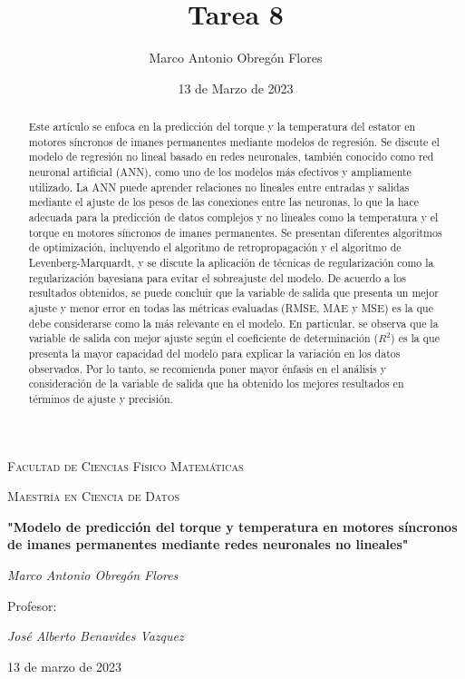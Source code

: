 \documentclass{article}
\title{Tarea 8}
\author{Marco Antonio Obregón Flores}
\date{13 de Marzo de 2023}
\begin{document}
\begin{titlepage}
    \centering
    {\scshape\large Facultad de Ciencias Físico Matemáticas\par}
    {\scshape\large Maestría en Ciencia de Datos\par}
    \vspace{1cm}
    {\huge\bfseries "Modelo de predicción del torque y temperatura en motores síncronos de imanes permanentes mediante redes neuronales no lineales"\par}
    \vspace{2cm}
    {\Large\itshape Marco Antonio Obregón Flores\par}
    \vfill
    {\large Profesor:\par}
    {\Large\itshape José Alberto Benavides Vazquez\par}
    \vspace{1cm}
    {\large 13 de marzo de 2023\par}
\end{titlepage}

\begin{abstract}
Este artículo se enfoca en la predicción del torque y la temperatura del estator en motores síncronos de imanes permanentes mediante modelos de regresión. Se discute el modelo de regresión no lineal basado en redes neuronales, también conocido como red neuronal artificial (ANN), como uno de los modelos más efectivos y ampliamente utilizado. La ANN puede aprender relaciones no lineales entre entradas y salidas mediante el ajuste de los pesos de las conexiones entre las neuronas, lo que la hace adecuada para la predicción de datos complejos y no lineales como la temperatura y el torque en motores síncronos de imanes permanentes. Se presentan diferentes algoritmos de optimización, incluyendo el algoritmo de retropropagación y el algoritmo de Levenberg-Marquardt, y se discute la aplicación de técnicas de regularización como la regularización bayesiana para evitar el sobreajuste del modelo.
De acuerdo a los resultados obtenidos, se puede concluir que la variable de salida que presenta un mejor ajuste y menor error en todas las métricas evaluadas (RMSE, MAE y MSE) es la que debe considerarse como la más relevante en el modelo. En particular, se observa que la variable de salida con mejor ajuste según el coeficiente de determinación ($R^2$) es la que presenta la mayor capacidad del modelo para explicar la variación en los datos observados. Por lo tanto, se recomienda poner mayor énfasis en el análisis y consideración de la variable de salida que ha obtenido los mejores resultados en términos de ajuste y precisión. 
\end{abstract}
\end{document}
